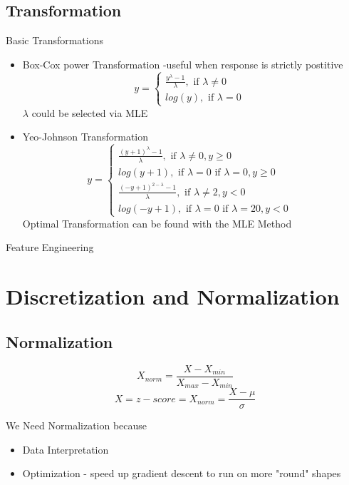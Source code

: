 \documentclass[11pt, openany]{book}              %
\begin{document}
\subsection{Transformation}

Basic Transformations

\begin{itemize}
    \item Box-Cox power Transformation -useful when response is strictly postitive
    $$y = \left\{
             \begin{array}{lr}
             \frac{y^\lambda -1}{\lambda}, \text{ if }\lambda \neq 0 &  \\
             log(y), \text{ if }\lambda = 0 &  
             \end{array}
      \right.$$
      $\lambda$ could be selected via MLE
    \item Yeo-Johnson Transformation
     $$y = \left\{
             \begin{array}{lr}
             \frac{(y+1)^\lambda -1}{\lambda}, \text{ if }\lambda \neq 0, y \geq 0 &  \\
             log(y+1), \text{ if }\lambda = 0 \text{ if }\lambda = 0, y \geq 0 &  \\
              \frac{(-y+1)^{2-\lambda} -1}{\lambda}, \text{ if }\lambda \neq 2, y < 0 &  \\
				log(-y+1), \text{ if }\lambda = 0 \text{ if }\lambda =2 0, y < 0 & 
			  
             \end{array}
      \right.$$ Optimal Transformation can be found with the MLE Method
\end{itemize}

Feature Engineering
\section{Discretization and Normalization}

\subsection{Normalization}

$$ X_{norm} = \frac{X -  X_{min}}{X_{max} - X_{min}}$$
$$ X = z-score = X_{norm} = \frac{X - \mu}{\sigma}$$

We Need Normalization because
\begin{itemize}
	\item Data Interpretation
	\item Optimization - speed up gradient descent to run on more "round" shapes	
\end{itemize}
\end{document}
